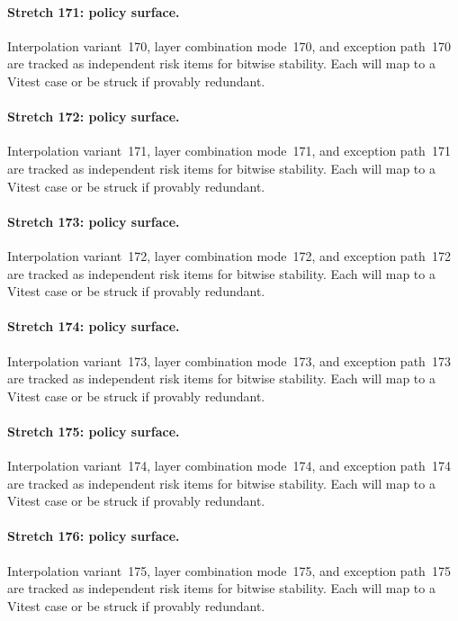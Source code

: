 \documentclass[sigconf,nonacm]{acmart}
\begin{document}
\paragraph{Stretch 171: policy surface.}
Interpolation variant~170, layer combination mode~170, and exception path~170 are tracked as independent risk items for bitwise stability. Each will map to a Vitest case or be struck if provably redundant. %

\paragraph{Stretch 172: policy surface.}
Interpolation variant~171, layer combination mode~171, and exception path~171 are tracked as independent risk items for bitwise stability. Each will map to a Vitest case or be struck if provably redundant. %

\paragraph{Stretch 173: policy surface.}
Interpolation variant~172, layer combination mode~172, and exception path~172 are tracked as independent risk items for bitwise stability. Each will map to a Vitest case or be struck if provably redundant. %

\paragraph{Stretch 174: policy surface.}
Interpolation variant~173, layer combination mode~173, and exception path~173 are tracked as independent risk items for bitwise stability. Each will map to a Vitest case or be struck if provably redundant. %

\paragraph{Stretch 175: policy surface.}
Interpolation variant~174, layer combination mode~174, and exception path~174 are tracked as independent risk items for bitwise stability. Each will map to a Vitest case or be struck if provably redundant. %

\paragraph{Stretch 176: policy surface.}
Interpolation variant~175, layer combination mode~175, and exception path~175 are tracked as independent risk items for bitwise stability. Each will map to a Vitest case or be struck if provably redundant. %
\end{document}
